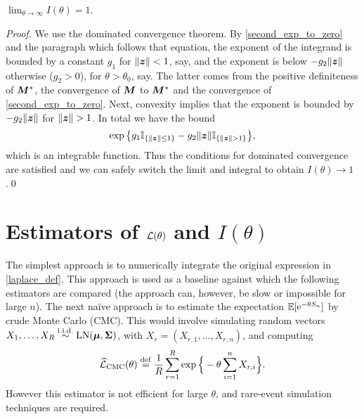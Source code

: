 \begin{proposition} $\lim_{\theta \to \infty} I(\theta) = 1$.
\end{proposition}

\begin{proof}
We use the dominated convergence theorem. By \eqref{second_exp_to_zero} and
the paragraph which follows that equation, the exponent of the integrand is
bounded by a constant $g_1$ for $\lVert \bm{z}\rVert < 1$, say, and the exponent is
below $-g_2 \lVert \bm{z}\rVert$ otherwise ($g_2 > 0$), for $\theta > \theta_0$, say. The
latter comes from the positive definiteness of $\bm{M}^*$, the convergence of
$\bm{M}$ to $\bm{M}^*$ and the convergence of \eqref{second_exp_to_zero}. Next,
convexity implies that the exponent is bounded by $-g_2\lVert \bm{z}\rVert$ for $\lVert \bm{z}\rVert
> 1$. In total we have the bound
%
\[ \exp \big\{ g_1 \mathbb I_{\{\lVert \bm{z}\rVert \leq 1\}} - g_2 \lVert \bm{z}\rVert \mathbb I_{\{\lVert \bm{z}\rVert
  > 1\}} \big\} , \]
%
which is an integrable function. Thus the conditions for dominated convergence
are satisfied and we can safely switch the limit and integral to obtain
$I(\theta) \to 1$.\qed
\end{proof}

\section{Estimators of $\mathcal{L}(\theta)$ and $I(\theta)$}\label{S:Laplace}

The simplest approach is to numerically integrate the original expression in
\eqref{laplace_def}. This approach is used as a baseline against which the
following estimators are compared (the approach can, however,  be slow or
impossible for large $n$). The next na{\"i}ve approach is to estimate the
expectation $\operatorname{{\mathbb E}}[\mathrm{e}^{-\theta S_n}]$ by crude Monte Carlo (CMC). This would
involve simulating random vectors $X_1, \dots, X_R \overset{\mathrm{i.i.d.}}{\sim} \mathrm{LN}(\bm{\mu},
\bm{\Sigma})$, with $X_r = (X_{r,1}, \dots, X_{r,n})$, and computing
%
\[ \widehat{\mathcal{L}}_{\mathrm{CMC}}(\theta) \overset{\mathrm{def}}{=} \frac{1}{R} \sum_{r=1}^R
  \exp\Big\{-\theta \sum_{i=1}^n X_{r,i}\Big\}. \]
%
However this estimator is not efficient for large $\theta$, and rare-event
simulation techniques are required.

